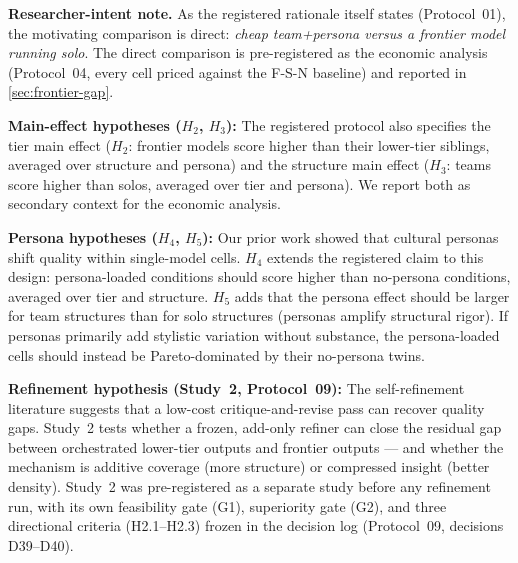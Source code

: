 \documentclass[12pt,a4paper]{article}
\begin{document}
\medskip
\noindent\textbf{Researcher-intent note.} As the registered rationale itself
states (Protocol~01), the motivating comparison is direct: \emph{cheap
team+persona versus a frontier model running solo}. The direct comparison is
pre-registered as the economic analysis (Protocol~04, every cell priced
against the F-S-N baseline) and reported in \cref{sec:frontier-gap}.

\medskip
\noindent\textbf{Main-effect hypotheses ($H_2$, $H_3$):} The registered
protocol also specifies the tier main effect ($H_2$: frontier models score
higher than their lower-tier siblings, averaged over structure and persona)
and the structure main effect ($H_3$: teams score higher than solos, averaged
over tier and persona). We report both as secondary context for the economic
analysis.

\medskip
\noindent\textbf{Persona hypotheses ($H_4$, $H_5$):} Our prior work
\citep{Hariri2026b} showed that cultural personas shift quality within
single-model cells. $H_4$ extends the registered claim to this design:
persona-loaded conditions should score higher than no-persona conditions,
averaged over tier and structure. $H_5$ adds that the persona effect should be
larger for team structures than for solo structures (personas amplify
structural rigor). If personas primarily add stylistic variation without
substance, the persona-loaded cells should instead be Pareto-dominated by
their no-persona twins.

\medskip
\noindent\textbf{Refinement hypothesis (Study~2, Protocol~09):} The
self-refinement literature \citep{ShinnEtAl2023} suggests that a low-cost
critique-and-revise pass can recover quality gaps. Study~2 tests whether a
frozen, add-only refiner can close the residual gap between orchestrated
lower-tier outputs and frontier outputs --- and whether the mechanism is
additive coverage (more structure) or compressed insight (better density).
Study~2 was pre-registered as a separate study before any refinement run,
with its own feasibility gate (G1), superiority gate (G2), and three
directional criteria (H2.1--H2.3) frozen in the decision log (Protocol~09,
decisions D39--D40).
\end{document}
